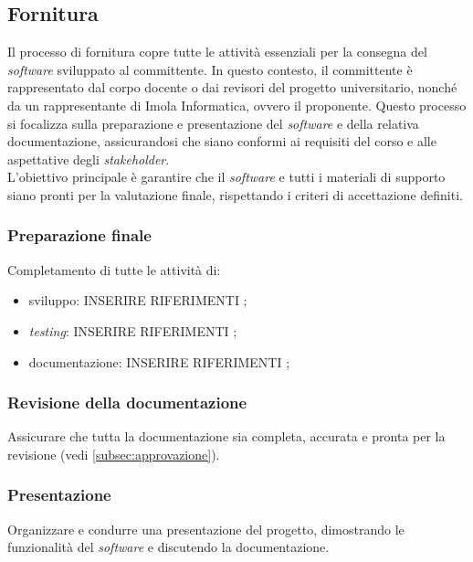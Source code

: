 \subsection{Fornitura}
Il processo di fornitura copre tutte le attività essenziali per la consegna del \textit{software} sviluppato al committente.
In questo contesto, il committente è rappresentato dal corpo docente o dai revisori del progetto universitario, nonché da un rappresentante di Imola Informatica, ovvero il proponente.
Questo processo si focalizza sulla preparazione e presentazione del \textit{software} e della relativa documentazione, assicurandosi che siano conformi ai requisiti del corso e alle aspettative degli \textit{stakeholder}. \\
L'obiettivo principale è garantire che il \textit{software} e tutti i materiali di supporto siano pronti per la valutazione finale, rispettando i criteri di accettazione definiti.


\subsubsection{Preparazione finale} 
Completamento di tutte le attività di:
\begin{itemize}
	\item sviluppo: INSERIRE RIFERIMENTI ;
	\item \textit{testing}: INSERIRE RIFERIMENTI ;
	\item documentazione: INSERIRE RIFERIMENTI ;
\end{itemize}


\subsubsection{Revisione della documentazione} 
Assicurare che tutta la documentazione sia completa, accurata e pronta per la revisione (vedi \cref{subsec:approvazione}).

\subsubsection{Presentazione} 
Organizzare e condurre una presentazione del progetto, dimostrando le 
funzionalità del \textit{software} e discutendo la documentazione.

